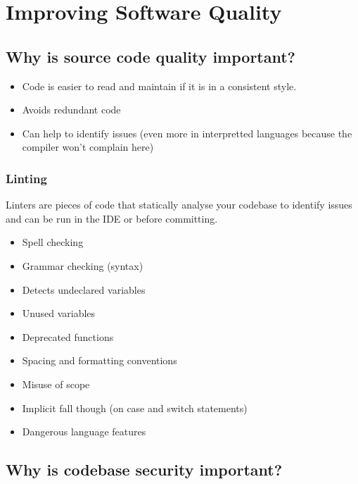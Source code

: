 \section{Improving Software Quality}\label{sec:improving_software_quality}

\subsection{Why is source code quality important?}\label{sub:why_is_source_code_quality_important_}

\begin{itemize}
    \item Code is easier to read and maintain if it is in a consistent style.
    \item Avoids redundant code
    \item Can help to identify issues (even more in interpretted languages because the compiler won't complain here)
\end{itemize}

\subsubsection{Linting}\label{ssub:linting}

Linters are pieces of code that statically analyse your codebase to identify issues and can be run in the IDE or before committing.

\begin{itemize}
    \item Spell checking
    \item Grammar checking (syntax)
    \item Detects undeclared variables
    \item Unused variables
    \item Deprecated functions
    \item Spacing and formatting conventions
    \item Misuse of scope
    \item Implicit fall though (on case and switch statements)
    \item Dangerous language features
\end{itemize}

\subsection{Why is codebase security important?}\label{sub:why_is_codebase_security_important_}

